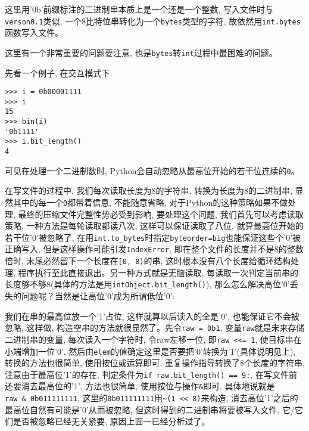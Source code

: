 \documentclass[a4paper]{ctexart}
\begin{document}
这里用'0b'前缀标注的二进制串本质上是一个还是一个整数, 写入文件时与\texttt{verson0.1}类似, 一个8比特位串转化为一个\texttt{bytes}类型的字符, 故依然用\texttt{int.bytes}函数写入文件。

这里有一个非常重要的问题要注意, 也是\texttt{bytes}转\texttt{int}过程中最困难的问题。

先看一个例子, 在交互模式下:

{\setmainfont{Courier New Bold}              
\begin{lstlisting}
>>> i = 0b00001111
>>> i
15
>>> bin(i)
'0b1111'
>>> i.bit_length()
4
\end{lstlisting}}

可见在处理一个二进制数时, Python会自动忽略从最高位开始的若干位连续的\texttt{\textquotesingle{}0\textquotesingle{}}。

在写文件的过程中, 我们每次读取长度为8的字符串, 转换为长度为8的二进制串, 显然其中的每一个\texttt{0}都带着信息, 不能随意省略, 对于Python的这种策略如果不做处理, 最终的压缩文件完整性势必受到影响, 要处理这个问题, 我们首先可以考虑读取策略, 一种方法是每轮读取都读八次, 这样可以保证读取了八位, 就算最高位开始的若干位'0'被忽略了, 在用\texttt{int.to\_bytes}时指定\texttt{byteorder=\textquotesingle{}big\textquotesingle{}}也能保证这些个'0'被正确写入, 但是这样操作可能引发\texttt{IndexError}, 即在整个文件的长度并不是8的整数倍时, 末尾必然留下一个长度在\texttt{{[}0,\ 8)}的串, 这时根本没有八个长度给循环结构处理, 程序执行至此直接退出。另一种方式就是无脑读取, 每读取一次判定当前串的长度够不够8(具体的方法是用\texttt{intObject.bit\_length()}), 那么怎么解决高位'0'丢失的问题呢？当然是让高位'0'成为所谓低位'0':

我们在串的最高位放一个'1'占位, 这样就算以后读入的全是'0', 也能保证它不会被忽略, 这样做, 构造空串的方法就很显然了。先令\texttt{raw\ =\ 0b1}, 变量\texttt{raw}就是未来存储二进制串的变量, 每次读入一个字符时, 令raw左移一位, 即\texttt{raw\ \textless{}\textless{}=\ 1}, 使目标串在小端增加一位'0', 然后由\texttt{elem}的值确定这里是否要把'0'转换为'1'(具体说明见上), 转换的方法也很简单, 使用按位或运算\texttt{\textbar{}}即可,
重复操作指导转换了8个长度的字符串, 注意由于最高位'1'的存在, 判定条件为\texttt{if\ raw.bit\_length()\ ==\ 9:}, 在写文件前还要消去最高位的'1', 方法也很简单, 使用按位与操作\texttt{\&}即可, 具体地说就是\texttt{raw\ \&\ 0b011111111}, 这里的\texttt{0b011111111}用\texttt{\textasciitilde{}(1\ \textless{}\textless{}\ 8)}来构造, 消去高位'1'之后的最高位自然有可能是'0'从而被忽略, 但这时得到的二进制串将要被写入文件, 它/它们是否被忽略已经无关紧要, 原因上面一已经分析过了。
\end{document}
